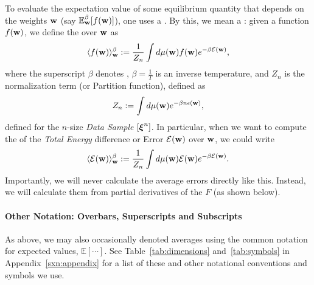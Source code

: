To evaluate the expectation value of some equilibrium quantity that depends on the weights ${\mathbf{w}}$ (say $\mathbb{E}^{\beta}_{{\mathbf{w}}}[f({\mathbf{w}})]$), one uses a \ThermalAverage.
By this, we mean a \emph{\BoltzmannWeightedAverage}: given a function $f({\mathbf{w}})$,
we define the \ThermalAverage over ${\mathbf{w}}$ as
\begin{align}
\label{eqn:thrmavg}
\langle f({\mathbf{w}})\rangle_{{\mathbf{w}}}^{{\beta}}:=\dfrac{1}{Z_{n}}\int d\mu({\mathbf{w}}) f({\mathbf{w}})e^{-\beta \mathcal{E}(\mathbf{w})}  ,
\end{align}
where the superscript $\beta$ denotes \ThermalAverage,
$\beta=\frac{1}{T}$ is an inverse temperature, and 
$Z_{n}$ is the normalization term (or Partition function), defined as
\begin{align}
\label{eqn:Zwn}
Z_{n}:=\int d\mu({\mathbf{w}}) e^{-\beta n\epsilon({\mathbf{w}})},
\end{align}
defined for the $n$-size \emph{Data Sample} $[\boldsymbol{\xi}^{n}]$.
%
In particular, when we want to compute the \ThermalAverage of the \emph{Total Energy} difference or Error
$\mathcal{E}(\mathbf{w})$ over ${\mathbf{w}}$, we could write
\begin{align}
\label{eqn:Detot}
\langle \mathcal{E}(\mathbf{w}) \rangle^{\beta}_{{\mathbf{w}}}:=\dfrac{1}{Z_{n}}\int d\mu({\mathbf{w}}) \mathcal{E}(\mathbf{w}) e^{-\beta \mathcal{E}(\mathbf{w})} .
\end{align}
Importantly, we will never calculate the average errors directly like this.
Instead, we will calculate them from partial derivatives of the \FreeEnergy $F$ (as shown below).

\paragraph{Other Notation: Overbars, Superscripts and Subscripts}
As above, we may also occasionally denoted averages using the common notation for expected values, $\mathbb{E}[\cdots]$.
See Table~\ref{tab:dimensions} and~\ref{tab:symbols} in Appendix~\ref{sxn:appendix} for a list of these and other notational conventions and symbols we use.

